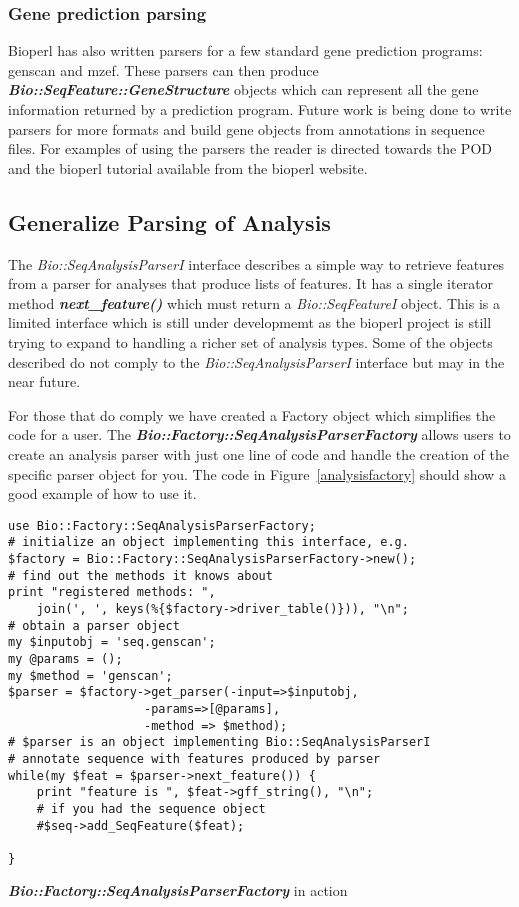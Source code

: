 \documentclass{article}
\begin{document}
\subsubsection{Gene prediction parsing}

Bioperl has also written parsers for a few standard gene prediction
programs: genscan and mzef.  These parsers can then produce \emph{\bf
Bio::SeqFeature::GeneStructure} objects which can represent all the
gene information returned by a prediction program.  Future work is
being done to write parsers for more formats and build gene objects
from annotations in sequence files.  For examples of using the parsers
the reader is directed towards the POD and the bioperl tutorial
available from the bioperl website.

\subsection{Generalize Parsing of Analysis}

The \emph{Bio::SeqAnalysisParserI} interface describes a simple way to
retrieve features from a parser for analyses that produce lists of
features.  It has a single iterator method {\it \bf next\_feature()}
which must return a \emph{Bio::SeqFeatureI} object.  This is a limited
interface which is still under developmemt as the bioperl project is
still trying to expand to handling a richer set of analysis types.
Some of the objects described do not comply to the
\emph{Bio::SeqAnalysisParserI} interface but may in the near future.
\par For those that do comply we have created a Factory object which
simplifies the code for a user.  The \emph{\bf
Bio::Factory::SeqAnalysisParserFactory} allows users to create an
analysis parser with just one line of code and handle the creation
of the specific parser object for you.  The code in
Figure~\ref{analysisfactory} should show a good example of how to use
it. 

\begin{table}[h]
\begin{verbatim}
use Bio::Factory::SeqAnalysisParserFactory;
# initialize an object implementing this interface, e.g.
$factory = Bio::Factory::SeqAnalysisParserFactory->new();
# find out the methods it knows about
print "registered methods: ",
    join(', ', keys(%{$factory->driver_table()})), "\n";
# obtain a parser object
my $inputobj = 'seq.genscan';
my @params = ();
my $method = 'genscan';
$parser = $factory->get_parser(-input=>$inputobj,
			       -params=>[@params],
			       -method => $method);
# $parser is an object implementing Bio::SeqAnalysisParserI
# annotate sequence with features produced by parser
while(my $feat = $parser->next_feature()) {
    print "feature is ", $feat->gff_string(), "\n";
    # if you had the sequence object
    #$seq->add_SeqFeature($feat);
    
}
\end{verbatim}
\label{analysisfactory}
\caption{\emph{\bf Bio::Factory::SeqAnalysisParserFactory} in action}
\end{table}
\end{document}
